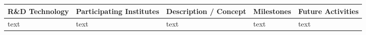 \thispagestyle{empty}
\begin{landscape}
\begin{sidewaystable}
    \centering
    \begin{adjustbox}{max width=1.1\textwidth,totalheight=1\textheight}
\begin{tabularx}{2\textheight}{lXXXX}
    \toprule
    R\&D Technology & Participating Institutes & Description / Concept & Milestones & Future Activities \\
    \midrule
    text & text & text & text & text 
    \bottomrule
\end{tabularx}
\end{adjustbox}
\end{sidewaystable}
\end{landscape}
\restoregeometry

